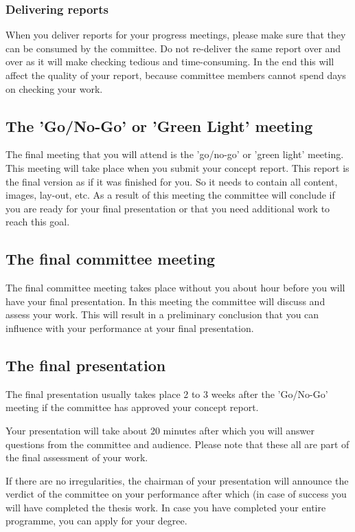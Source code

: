 \documentclass{latex-format/stylesheets/BEMNextstyle}
\begin{document}
\subsubsection*{Delivering reports}
When you deliver reports for your progress meetings, please make sure that they can be consumed by the committee. Do not re-deliver the same report over and over as it will make checking tedious and time-consuming. In the end this will affect the quality of your report, because committee members cannot spend days on checking your work.

\subsection*{The 'Go/No-Go' or 'Green Light' meeting}
The final meeting that you will attend is the 'go/no-go' or 'green light' meeting. This meeting will take place when you submit your concept report. This report is the final version as if it was finished for you. So it needs to contain all content, images, lay-out, etc. As a result of this meeting the committee will conclude if you are ready for your final presentation or that you need additional work to reach this goal.

\subsection*{The final committee meeting}
The final committee meeting takes place without you about hour before you will have your final presentation. In this meeting the committee will discuss and assess your work. This will result in a preliminary conclusion that you can influence with your performance at your final presentation. 

\subsection*{The final presentation}
The final presentation usually takes place 2 to 3 weeks after the 'Go/No-Go' meeting if the committee has approved your concept report.

Your presentation will take about 20 minutes after which you will answer questions from the committee and audience. Please note that these all are part of the final assessment of your work.

If there are no irregularities, the chairman of your presentation will announce the verdict of the committee on your performance after which (in case of success you will have completed the thesis work. In case you have completed your entire programme, you can apply for your degree.
\end{document}
